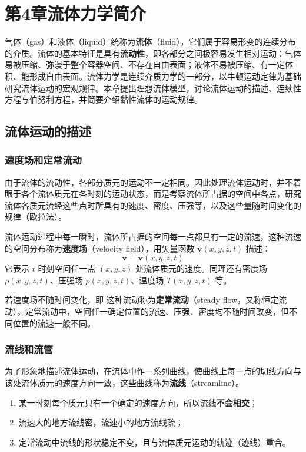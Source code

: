 \chapter{第4章\texorpdfstring{\hspace{0.5em}}{ }流体力学简介}

气体（gas）和液体（liquid）统称为\textbf{流体}（fluid），它们属于容易形变的连续分布的介质。流体的基本特征是具有\textbf{流动性}，即各部分之间极容易发生相对运动：气体易被压缩、弥漫于整个容器空间、不存在自由表面；液体不易被压缩、有一定体积、能形成自由表面。流体力学是连续介质力学的一部分，以牛顿运动定律为基础研究流体运动的宏观规律。本章提出理想流体模型，讨论流体运动的描述、连续性方程与伯努利方程，并简要介绍黏性流体的运动规律。

\section{流体运动的描述}
    \subsection{速度场和定常流动}
    由于流体的流动性，各部分质元的运动不一定相同。因此处理流体运动时，并不着眼于各个流体质元在各时刻的运动状态，而是考察流体所占据的空间中各点，研究流体各质元流经这些点时所具有的速度、密度、压强等，以及这些量随时间变化的规律（欧拉法）。

    流体运动过程中每一瞬时，流体所占据的空间每一点都具有一定的流速，这种流速的空间分布称为\textbf{速度场}（velocity field），用矢量函数 $\boldsymbol{v}(x,y,z,t)$ 描述：
    \[
    \boldsymbol{v}=\boldsymbol{v}(x,y,z,t)
    \]
    它表示 $t$ 时刻空间任一点 $(x,y,z)$ 处流体质元的速度。同理还有密度场 $\rho(x,y,z,t)$、压强场 $p(x,y,z,t)$、温度场 $T(x,y,z,t)$ 等。

    若速度场不随时间变化，即
    这种流动称为\textbf{定常流动}（steady flow，又称恒定流动）。定常流动中，空间任一确定位置的流速、压强、密度均不随时间改变，但不同位置的流速一般不同。

    \subsection{流线和流管}
    为了形象地描述流体运动，在流体中作一系列曲线，使曲线上每一点的切线方向与该处流体质元的速度方向一致，这些曲线称为\textbf{流线}（streamline）。
    \begin{enumerate}
        \item 某一时刻每个质元只有一个确定的速度方向，所以流线\textbf{不会相交}；
        \item 流速大的地方流线密，流速小的地方流线疏；
        \item 定常流动中流线的形状稳定不变，且与流体质元运动的轨迹（迹线）重合。
    \end{enumerate}

